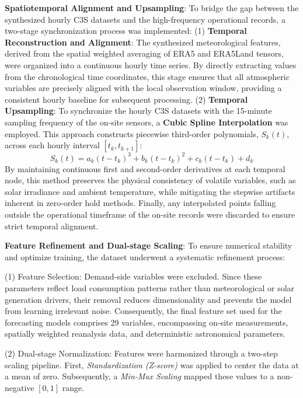 \documentclass[conference]{IEEEtran}
\begin{document}
	\textbf{Spatiotemporal Alignment and Upsampling}: To bridge the gap between the synthesized hourly C3S datasets and the high-frequency operational records, a two-stage synchronization process was implemented: (1) \textbf{Temporal Reconstruction and Alignment}: The synthesized meteorological features, derived from the spatial weighted averaging of ERA5 and ERA5Land tensors, were organized into a continuous hourly time series. By directly extracting values from the chronological time coordinates, this stage ensures that all atmospheric variables are precisely aligned with the local observation window, providing a consistent hourly baseline for subsequent processing. (2) \textbf{Temporal Upsampling}: To synchronize the hourly C3S datasets with the 15-minute sampling frequency of the on-site sensors, a \textbf{Cubic Spline Interpolation} was employed. This approach constructs piecewise third-order polynomials, $S_k(t)$, across each hourly interval $[t_k, t_{k+1}]$:
		\begin{equation*}
			S_k(t) = a_k(t - t_k)^3 + b_k(t - t_k)^2 + c_k(t - t_k) + d_k
		\end{equation*}
	By maintaining continuous first and second-order derivatives at each temporal node, this method preserves the physical consistency of volatile variables, such as solar irradiance and ambient temperature, while mitigating the stepwise artifacts inherent in zero-order hold methods. Finally, any interpolated points falling outside the operational timeframe of the on-site records were discarded to ensure strict temporal alignment.
	
	\textbf{Feature Refinement and Dual-stage Scaling}: To ensure numerical stability and optimize training, the dataset underwent a systematic refinement process:
	
	(1) Feature Selection: Demand-side variables were excluded. Since these parameters reflect load consumption patterns rather than meteorological or solar generation drivers, their removal reduces dimensionality and prevents the model from learning irrelevant noise. Consequently, the final feature set used for the forecasting models comprises 29 variables, encompassing on-site measurements, spatially weighted reanalysis data, and deterministic astronomical parameters.
		
	(2) Dual-stage Normalization: Features were harmonized through a two-step scaling pipeline. First, \textit{Standardization (Z-score)} was applied to center the data at a mean of zero. Subsequently, a \textit{Min-Max Scaling} mapped these values to a non-negative $[0, 1]$ range.
			
\end{document}
